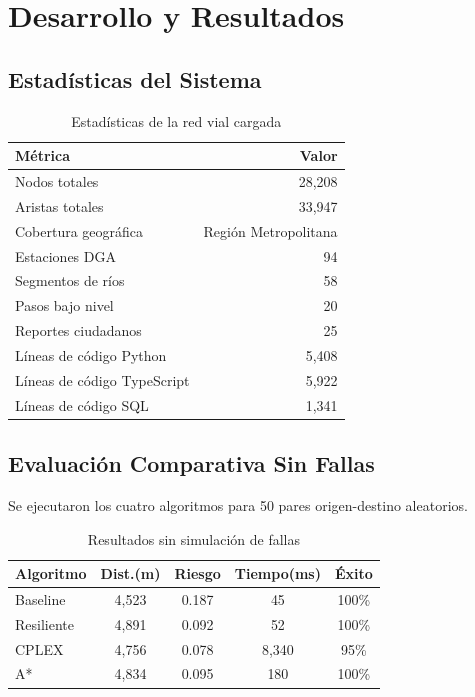 \documentclass[conference]{IEEEtran}
\begin{document}
\section{Desarrollo y Resultados}

\subsection{Estadísticas del Sistema}

\begin{table}[!t]
\centering
\caption{Estadísticas de la red vial cargada}
\begin{tabular}{@{}lr@{}}
\toprule
\textbf{Métrica} & \textbf{Valor} \\
\midrule
Nodos totales & 28,208 \\
Aristas totales & 33,947 \\
Cobertura geográfica & Región Metropolitana \\
\midrule
Estaciones DGA & 94 \\
Segmentos de ríos & 58 \\
Pasos bajo nivel & 20 \\
Reportes ciudadanos & 25 \\
\midrule
Líneas de código Python & 5,408 \\
Líneas de código TypeScript & 5,922 \\
Líneas de código SQL & 1,341 \\
\bottomrule
\end{tabular}
\end{table}

\subsection{Evaluación Comparativa Sin Fallas}

Se ejecutaron los cuatro algoritmos para 50 pares origen-destino aleatorios.

\begin{table}[!t]
\centering
\caption{Resultados sin simulación de fallas}
\begin{tabular}{@{}lcccc@{}}
\toprule
\textbf{Algoritmo} & \textbf{Dist.(m)} & \textbf{Riesgo} & \textbf{Tiempo(ms)} & \textbf{Éxito} \\
\midrule
Baseline & 4,523 & 0.187 & 45 & 100\% \\
Resiliente & 4,891 & 0.092 & 52 & 100\% \\
CPLEX & 4,756 & 0.078 & 8,340 & 95\% \\
A* & 4,834 & 0.095 & 180 & 100\% \\
\bottomrule
\end{tabular}
\end{table}
\end{document}
